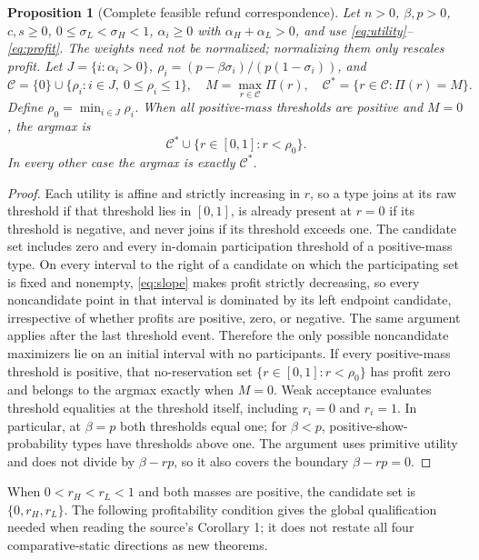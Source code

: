 \documentclass[12pt]{article}
\newtheorem{proposition}{Proposition}
\begin{document}
\begin{proposition}[Complete feasible refund correspondence]
\label{prop:global}
Let $n>0$, $\beta,p>0$, $c,s\geq0$, $0\leq\sigma_L<\sigma_H<1$, $\alpha_i\geq0$ with $\alpha_H+\alpha_L>0$, and use \eqref{eq:utility}--\eqref{eq:profit}. The weights need not be normalized; normalizing them only rescales profit. Let $J=\{i:\alpha_i>0\}$, $\rho_i=(p-\beta\sigma_i)/(p(1-\sigma_i))$, and
\[
 \mathcal C=\{0\}\cup\{\rho_i:i\in J,\ 0\leq\rho_i\leq1\},\quad
 M=\max_{r\in\mathcal C}\Pi(r),\quad
 \mathcal C^*=\{r\in\mathcal C:\Pi(r)=M\}.
\]
Define $\rho_0=\min_{i\in J}\rho_i$. When all positive-mass thresholds are positive and $M=0$, the argmax is
\[
 \mathcal C^*\cup\{r\in[0,1]:r<\rho_0\}.
\]
In every other case the argmax is exactly $\mathcal C^*$.
\end{proposition}

\begin{proof}
Each utility is affine and strictly increasing in $r$, so a type joins at its raw threshold if that threshold lies in $[0,1]$, is already present at $r=0$ if its threshold is negative, and never joins if its threshold exceeds one. The candidate set includes zero and every in-domain participation threshold of a positive-mass type. On every interval to the right of a candidate on which the participating set is fixed and nonempty, \eqref{eq:slope} makes profit strictly decreasing, so every noncandidate point in that interval is dominated by its left endpoint candidate, irrespective of whether profits are positive, zero, or negative. The same argument applies after the last threshold event. Therefore the only possible noncandidate maximizers lie on an initial interval with no participants. If every positive-mass threshold is positive, that no-reservation set $\{r\in[0,1]:r<\rho_0\}$ has profit zero and belongs to the argmax exactly when $M=0$. Weak acceptance evaluates threshold equalities at the threshold itself, including $r_i=0$ and $r_i=1$. In particular, at $\beta=p$ both thresholds equal one; for $\beta<p$, positive-show-probability types have thresholds above one. The argument uses primitive utility and does not divide by $\beta-rp$, so it also covers the boundary $\beta-rp=0$.
\end{proof}

When $0<r_H<r_L<1$ and both masses are positive, the candidate set is $\{0,r_H,r_L\}$. The following profitability condition gives the global qualification needed when reading the source's Corollary 1; it does not restate all four comparative-static directions as new theorems.
\end{document}
